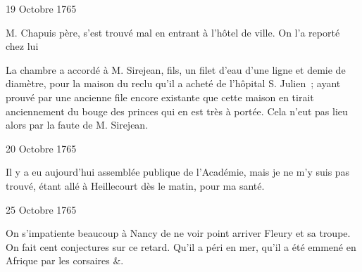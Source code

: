                      \begin{diary}{19 Octobre 1765}{}
                        
                        
                           M. Chapuis père, s'est trouvé
                           mal en entrant
                           à l'hôtel de ville. On l'a
                           reporté chez lui \bigskip
        
        
                         La chambre a accordé à M. Sirejean,
                              fils, un
                           filet d'eau d'une ligne et demie de diamètre,
                           pour la maison du reclu qu'il a acheté de l'hôpital
                              S. Julien ; ayant prouvé par une ancienne file
                           encore existante que cette maison en tirait
                           anciennement du bouge des princes qui en est
                           très à portée. Cela n'eut pas lieu alors par
                           la faute de M. Sirejean. \bigskip
        
        
                     \end{diary}

                     \begin{diary}{20 Octobre 1765}{}
                        
                         Il y a eu aujourd'hui assemblée publique
                           de
                           l'Académie, mais je ne m'y
                           suis pas trouvé, étant allé à Heillecourt dès le
                           matin, pour ma santé. \bigskip
        
        
                     \end{diary}

                     \begin{diary}{25 Octobre 1765}{}
                        
                         On s'impatiente beaucoup à
                              Nancy de ne
                           voir point arriver Fleury et sa
                           troupe. On
                           fait cent conjectures sur ce retard. Qu'il
                           a péri en mer, qu'il a été emmené en Afrique
                           par les corsaires &. \bigskip
        
        
                     \end{diary}

